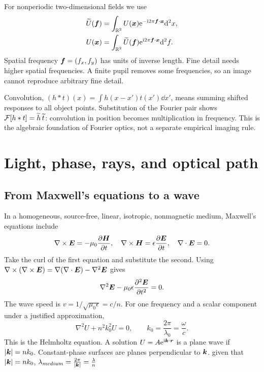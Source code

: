 For nonperiodic two-dimensional fields we use
\begin{align}
\widetilde U(\bm{f})&=\int_{\mathbb{R}^2}U(\bm{x})
\mathrm{e}^{-\mathrm{i}2\pi\bm{f}\cdot\bm{x}}\mathrm{d}^2x,\\
U(\bm{x})&=\int_{\mathbb{R}^2}\widetilde U(\bm{f})
\mathrm{e}^{\mathrm{i}2\pi\bm{f}\cdot\bm{x}}\mathrm{d}^2f.
\label{eq:fourierpair}
\end{align}
Spatial frequency $\bm{f}=(f_x,f_y)$ has units of inverse length.
Fine detail needs higher spatial frequencies. A finite pupil removes
some frequencies, so an image cannot reproduce arbitrary fine detail.

Convolution, $(h*t)(x)=\int h(x-x')t(x')\dd x'$, means summing shifted
responses to all object points. Substitution of the Fourier pair shows
$\mathcal{F}[h*t]=\widetilde h\,\widetilde t$: convolution in position becomes
multiplication in frequency. This is the algebraic foundation of Fourier
optics, not a separate empirical imaging rule.

\chapter{Light, phase, rays, and optical path}\label{ch:waves}

\section{From Maxwell's equations to a wave}
In a homogeneous, source-free, linear, isotropic, nonmagnetic medium,
Maxwell's equations include
\[
\nabla\times\bm{E}=-\mu_0\frac{\partial\bm{H}}{\partial t},\quad
\nabla\times\bm{H}=\epsilon\frac{\partial\bm{E}}{\partial t},\quad
\nabla\cdot\bm{E}=0.
\]
Take the curl of the first equation and substitute the second.
Using $\nabla\times(\nabla\times\bm{E})
=\nabla(\nabla\cdot\bm{E})-\nabla^2\bm{E}$ gives
\begin{equation}
\nabla^2\bm{E}-\mu_0\epsilon\frac{\partial^2\bm{E}}{\partial t^2}=0.
\end{equation}
The wave speed is $v=1/\sqrt{\mu_0\epsilon}=c/n$.
For one frequency and a scalar component under a justified approximation,
\begin{equation}
\nabla^2 U+n^2k_0^2U=0,\qquad
k_0=\frac{2\pi}{\lambda_0}=\frac{\omega}{c}.
\label{eq:helmholtz}
\end{equation}
This is the Helmholtz equation. A solution
$U=A\mathrm{e}^{\mathrm{i}\bm{k}\cdot\bm{r}}$ is a plane wave if
$|\bm{k}|=nk_0$. Constant-phase surfaces are planes perpendicular to
$\bm{k}$. given that $|\bm{k}|=nk_0$, $\lambda_{medium}  = \frac{2\pi}{|\bm{k}|} = \frac{\lambda}{n}$

